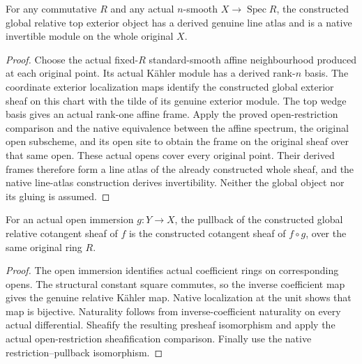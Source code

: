 \begin{theorem}
\label{thm:kn-arithmetic-global-canonical-atlas}
\leanok
{}
For any commutative $R$ and any actual $n$-smooth $X\to\operatorname{Spec}R$,
the constructed global relative top exterior object has a derived genuine
line atlas and is a native invertible module on the whole original $X$.
\end{theorem}
\begin{proof}
Choose the actual fixed-$R$ standard-smooth affine neighbourhood produced at
each original point.  Its actual K\"ahler module has a derived rank-$n$ basis.
The coordinate exterior localization maps identify the constructed global
exterior sheaf on this chart with the tilde of its genuine exterior module.
The top wedge basis gives an actual rank-one affine frame.  Apply the proved
open-restriction comparison and the native equivalence between the affine
spectrum, the original open subscheme, and its open site to obtain the frame
on the original sheaf over that same open.  These actual opens cover every
original point.  Their derived frames therefore form a line atlas of the
already constructed whole sheaf, and the native line-atlas construction
derives invertibility.  Neither the global object nor its gluing is assumed.
\end{proof}

\begin{lemma}
\label{lem:kn-arithmetic-global-cotangent-restriction}
\leanok
{}
For an actual open immersion $g:Y\to X$, the pullback of the constructed
global relative cotangent sheaf of $f$ is the constructed cotangent sheaf of
$f\circ g$, over the same original ring $R$.
\end{lemma}
\begin{proof}
The open immersion identifies actual coefficient rings on corresponding
opens.  The structural constant square commutes, so the inverse coefficient
map gives the genuine relative K\"ahler map.  Native localization at the unit
shows that map is bijective.  Naturality follows from inverse-coefficient
naturality on every actual differential.  Sheafify the resulting presheaf
isomorphism and apply the actual open-restriction sheafification comparison.
Finally use the native restriction--pullback isomorphism.
\end{proof}

